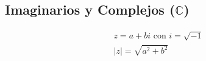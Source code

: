 \subsection{Imaginarios y Complejos ($\mathbb{C}$)}
\begin{gather*} 
z = a + bi \text{ con } i = \sqrt{-1}\\
\mid z \mid = \sqrt{a^2 + b^2}\\
\end{gather*}
